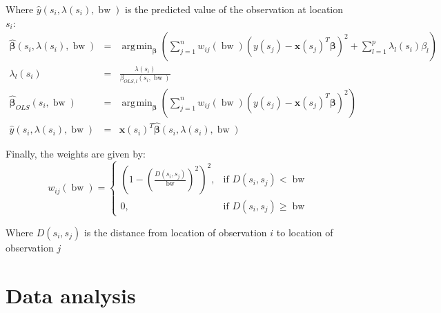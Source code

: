 \documentclass[authoryear ,review]{elsarticle}
\DeclareMathOperator*{\argmin}{\arg\!\min}
\DeclareMathOperator*{\bw}{\mbox{bw}}
\newcommand{\vect}[1]{\boldsymbol{#1}}
\begin{document}
		Where $\hat{y}\left(s_i, \lambda(s_i), \bw \right)$ is the predicted value of the observation at location $s_i$:
		\begin{eqnarray*}
			\hat{\vect{\beta}}\left(s_i, \lambda(s_i), \bw \right) &=& \argmin_{\vect{\beta}} \left( \sum_{j = 1}^n w_{ij}(\bw)\left(y(s_j) - \vect{x}(s_j)^T \vect{\beta}\right)^2  +  \sum_{l=1}^p \lambda_{l}(s_i) \beta_l \right)\\
			\lambda_{l}(s_i) &=& \frac{\lambda(s_i)}{\beta_{OLS,l}(s_i, \bw)}\\
			\hat{\vect{\beta}}_{OLS}(s_i, \bw) &=& \argmin_{\vect{\beta}} \left( \sum_{j=1}^{n} w_{ij}(\bw)\left(y(s_j) - \vect{x}(s_j)^T \vect{\beta}\right)^2\right)\\
			\hat{y}\left(s_i, \lambda(s_i), \bw \right) &=& \vect{x}(s_i)^T \hat{\vect{\beta}}\left(s_i, \lambda(s_i), \bw \right)
		\end{eqnarray*}
		
		Finally, the weights are given by:
		\[
			w_{ij}(\bw) =  \begin{cases} \left(1-\left(\frac{D(s_i,s_j)}{\bw}\right)^2\right)^2, & \mbox{if } D(s_i,s_j) < \bw \\
			0, & \mbox{if }D(s_i,s_j) \ge \bw \end{cases}
		\]
		
		Where $D(s_i,s_j)$ is the distance from location of observation $i$ to location of observation $j$\\
		
		
	\section{Data analysis}
\end{document}
